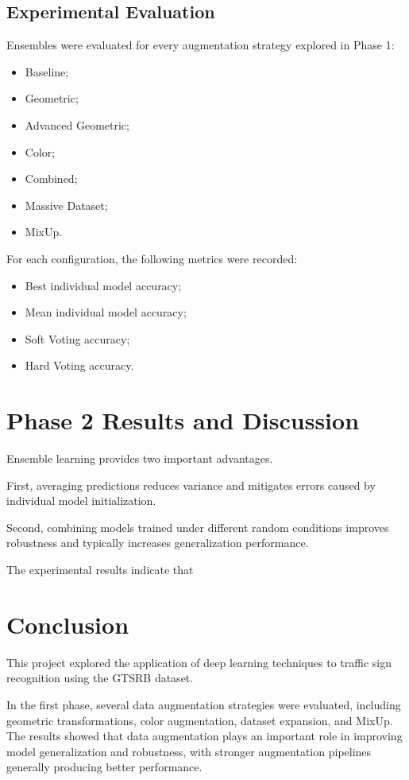 \documentclass[conference,a4paper]{IEEEtran}
\begin{document}
\subsection{Experimental Evaluation}
Ensembles were evaluated for every augmentation strategy explored in Phase 1:

\begin{itemize}
\item Baseline;
\item Geometric;
\item Advanced Geometric;
\item Color;
\item Combined;
\item Massive Dataset;
\item MixUp.
\end{itemize}

For each configuration, the following metrics were recorded:

\begin{itemize}
\item Best individual model accuracy;
\item Mean individual model accuracy;
\item Soft Voting accuracy;
\item Hard Voting accuracy.
\end{itemize}

\section{Phase 2 Results and Discussion} 

Ensemble learning provides two important advantages.

First, averaging predictions reduces variance and mitigates errors caused by individual model initialization.

Second, combining models trained under different random conditions improves robustness and typically increases generalization performance.

The experimental results indicate that

\section{Conclusion} 

This project explored the application of deep learning techniques to traffic sign recognition using the GTSRB dataset.

In the first phase, several data augmentation strategies were evaluated, including geometric transformations, color augmentation, dataset expansion, and MixUp. The results showed that data augmentation plays an important role in improving model generalization and robustness, with stronger augmentation pipelines generally producing better performance.
\end{document}
